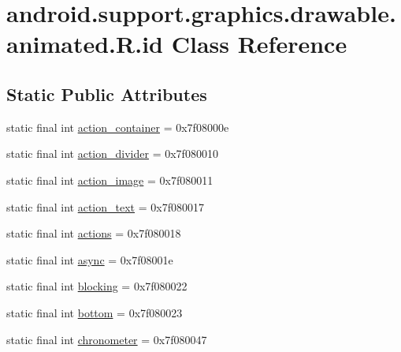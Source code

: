 \hypertarget{classandroid_1_1support_1_1graphics_1_1drawable_1_1animated_1_1_r_1_1id}{}\section{android.\+support.\+graphics.\+drawable.\+animated.\+R.\+id Class Reference}
\label{classandroid_1_1support_1_1graphics_1_1drawable_1_1animated_1_1_r_1_1id}
\subsection*{Static Public Attributes}
\begin{DoxyCompactItemize}
\item 
static final int \mbox{\hyperlink{classandroid_1_1support_1_1graphics_1_1drawable_1_1animated_1_1_r_1_1id_ad3a8b5e39a6727f8720761828138ad36}{action\+\_\+container}} = 0x7f08000e
\item 
static final int \mbox{\hyperlink{classandroid_1_1support_1_1graphics_1_1drawable_1_1animated_1_1_r_1_1id_a4af26dc65a6b402ba33678a7f89d8d5f}{action\+\_\+divider}} = 0x7f080010
\item 
static final int \mbox{\hyperlink{classandroid_1_1support_1_1graphics_1_1drawable_1_1animated_1_1_r_1_1id_a863126afa0357acc99cddb49182f4bfe}{action\+\_\+image}} = 0x7f080011
\item 
static final int \mbox{\hyperlink{classandroid_1_1support_1_1graphics_1_1drawable_1_1animated_1_1_r_1_1id_af05367c558932061cceefe3714a9a7c2}{action\+\_\+text}} = 0x7f080017
\item 
static final int \mbox{\hyperlink{classandroid_1_1support_1_1graphics_1_1drawable_1_1animated_1_1_r_1_1id_a9364b1d2e05fccd3dc7b3a7e37805370}{actions}} = 0x7f080018
\item 
static final int \mbox{\hyperlink{classandroid_1_1support_1_1graphics_1_1drawable_1_1animated_1_1_r_1_1id_aaf83309e2e73f818a1fbebb84bd5926d}{async}} = 0x7f08001e
\item 
static final int \mbox{\hyperlink{classandroid_1_1support_1_1graphics_1_1drawable_1_1animated_1_1_r_1_1id_a4b3c8c9b4c312a1f8cf398460635f01f}{blocking}} = 0x7f080022
\item 
static final int \mbox{\hyperlink{classandroid_1_1support_1_1graphics_1_1drawable_1_1animated_1_1_r_1_1id_af060c285d2f5312197fec5be98b0466c}{bottom}} = 0x7f080023
\item 
static final int \mbox{\hyperlink{classandroid_1_1support_1_1graphics_1_1drawable_1_1animated_1_1_r_1_1id_a57c4a9260d9b490170f2179498e023cc}{chronometer}} = 0x7f080047

\end{DoxyCompactItemize}
